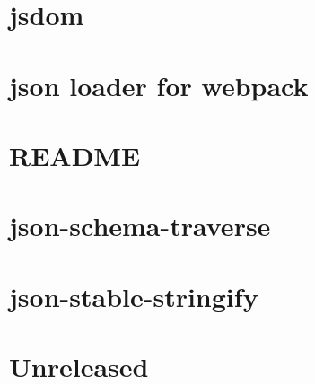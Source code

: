\documentclass[twoside]{book}
\newcommand{\+}{\discretionary{\mbox{\scriptsize$\hookleftarrow$}}{}{}}
\begin{document}
\chapter{jsdom}
\label{md__c_1_workspace_demo_src_main_script_node_modules_jsdom__r_e_a_d_m_e}

\chapter{json loader for webpack}
\label{md__c_1_workspace_demo_src_main_script_node_modules_json-loader__r_e_a_d_m_e}

\chapter{R\+E\+A\+D\+ME}
\label{md__c_1_workspace_demo_src_main_script_node_modules_json-schema__r_e_a_d_m_e}

\chapter{json-\/schema-\/traverse}
\label{md__c_1_workspace_demo_src_main_script_node_modules_json-schema-traverse__r_e_a_d_m_e}

\chapter{json-\/stable-\/stringify}
\label{md__c_1_workspace_demo_src_main_script_node_modules_json-stable-stringify_readme}

\chapter{Unreleased}
\label{md__c_1_workspace_demo_src_main_script_node_modules_json-stringify-safe__c_h_a_n_g_e_l_o_g}

\end{document}

